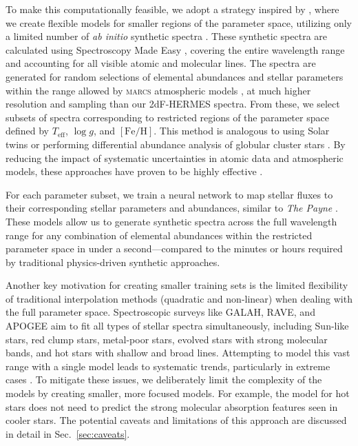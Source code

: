 \documentclass[
  journal=pasa,
  manuscript=research-paper, %
  year=2024,
  volume=37
]{cup-journal}
\newcommand{\Teff}{$T_\mathrm{eff}$\xspace}
\newcommand{\logg}{$\log g$\xspace}
\newcommand{\feh}{$\mathrm{[Fe/H]}$\xspace}
\newcommand{\sme}{\textsc{sme}\xspace}
\newcommand{\marcs}{\textsc{marcs}\xspace}
\begin{document}
To make this computationally feasible, we adopt a strategy inspired by \citet{Rix2016}, where we create flexible models for smaller regions of the parameter space, utilizing only a limited number of \textit{ab initio} synthetic spectra \citep[see also][]{Ting2016b}. These synthetic spectra are calculated using Spectroscopy Made Easy \citep[\sme][]{Valenti1996,Piskunov2017}, covering the entire wavelength range and accounting for all visible atomic and molecular lines. The spectra are generated for random selections of elemental abundances and stellar parameters within the range allowed by \marcs atmospheric models \citep{Gustafsson2008}, at much higher resolution and sampling than our 2dF-HERMES spectra. From these, we select subsets of spectra corresponding to restricted regions of the parameter space defined by \Teff, \logg, and \feh. This method is analogous to using Solar twins \citep[see, e.g.,][]{Nissen2015} or performing differential abundance analysis of globular cluster stars \citep[e.g.,][]{Yong2013, Monty2023}. By reducing the impact of systematic uncertainties in atomic data and atmospheric models, these approaches have proven to be highly effective \citep{Nissen2018}.

For each parameter subset, we train a neural network to map stellar fluxes to their corresponding stellar parameters and abundances, similar to \textit{The Payne} \citep{Ting2019}. These models allow us to generate synthetic spectra across the full wavelength range for any combination of elemental abundances within the restricted parameter space in under a second—compared to the minutes or hours required by traditional physics-driven synthetic approaches.

Another key motivation for creating smaller training sets is the limited flexibility of traditional interpolation methods (quadratic and non-linear) when dealing with the full parameter space. Spectroscopic surveys like GALAH, RAVE, and APOGEE aim to fit all types of stellar spectra simultaneously, including Sun-like stars, red clump stars, metal-poor stars, evolved stars with strong molecular bands, and hot stars with shallow and broad lines. Attempting to model this vast range with a single model leads to systematic trends, particularly in extreme cases \citep{Casey2016, Buder2018, Ting2019}. To mitigate these issues, we deliberately limit the complexity of the models by creating smaller, more focused models. For example, the model for hot stars does not need to predict the strong molecular absorption features seen in cooler stars. The potential caveats and limitations of this approach are discussed in detail in Sec.~\ref{sec:caveats}.
\end{document}
